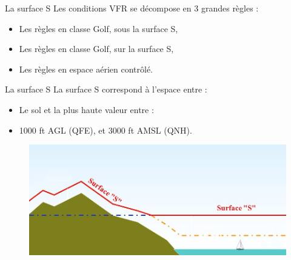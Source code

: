 \documentclass{beamer}
\begin{document}
\begin{frame}{La surface S}
  Les conditions VFR se décompose en 3 grandes règles :

  \begin{itemize}
    \item Les règles en classe Golf, sous la surface S, \pause
    \item Les règles en classe Golf, sur la surface S, \pause
    \item Les règles en espace aérien contrôlé.
  \end{itemize}

\end{frame}


\begin{frame}{La surface S}
  La surface S correspond à l'espace entre :

  \begin{itemize}
    \item Le sol et la plus haute valeur entre : \pause
    \item 1000 ft AGL (QFE), et 3000 ft AMSL (QNH). \pause
  \end{itemize}

  \pause
  \begin{figure}
    \centering
    \includegraphics[scale=1.2]{images/surface-s.png}
  \end{figure}
  
\end{frame}
\end{document}
